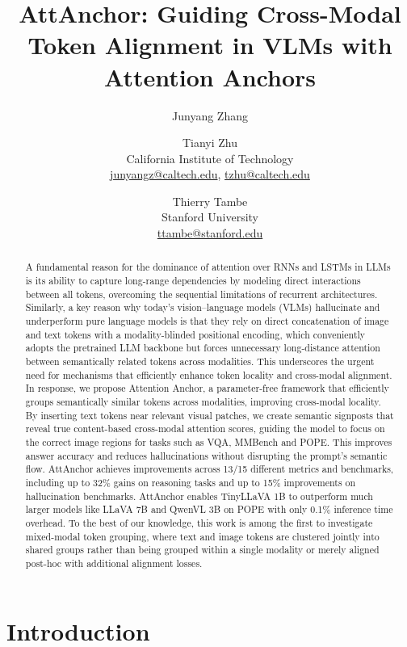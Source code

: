 \documentclass[11pt]{article}
\title{AttAnchor: Guiding Cross-Modal Token Alignment in VLMs with Attention Anchors}
\author{Junyang Zhang \and Tianyi Zhu\\
California Institute of Technology\\
\href{mailto:junyangz@caltech.edu}{junyangz@caltech.edu}, \href{mailto:tzhu@caltech.edu}{tzhu@caltech.edu}
\and
Thierry Tambe\\
Stanford University\\
\href{mailto:ttambe@stanford.edu}{ttambe@stanford.edu}
}
\begin{document}
\captionsetup{position=bottom}
\captionsetup[figure]{position=bottom}
\captionsetup[table]{position=bottom}

\maketitle

\begin{abstract}
A fundamental reason for the dominance of attention over RNNs and LSTMs in LLMs is its ability to capture long-range dependencies by modeling direct interactions between all tokens, overcoming the sequential limitations of recurrent architectures. Similarly, a key reason why today's vision–language models (VLMs) hallucinate and underperform pure language models is that they rely on direct concatenation of image and text tokens with a modality-blinded positional encoding, which conveniently adopts the pretrained LLM backbone but forces unnecessary long-distance attention between semantically related tokens across modalities. This underscores the urgent need for mechanisms that efficiently enhance token locality and cross-modal alignment. In response, we propose Attention Anchor, a parameter-free framework that efficiently groups semantically similar tokens across modalities, improving cross-modal locality. By inserting text tokens near relevant visual patches, we create semantic signposts that reveal true content-based cross-modal attention scores, guiding the model to focus on the correct image regions for tasks such as VQA, MMBench and POPE. This improves answer accuracy and reduces hallucinations without disrupting the prompt's semantic flow. AttAnchor achieves improvements across 13/15 different metrics and benchmarks, including up to 32\% gains on reasoning tasks and up to 15\% improvements on hallucination benchmarks. AttAnchor enables TinyLLaVA 1B to outperform much larger models like LLaVA 7B and QwenVL 3B on POPE with only 0.1\% inference time overhead. To the best of our knowledge, this work is among the first to investigate mixed-modal token grouping, where text and image tokens are clustered jointly into shared groups rather than being grouped within a single modality or merely aligned post-hoc with additional alignment losses.
\end{abstract}

\section{Introduction}
\end{document}
